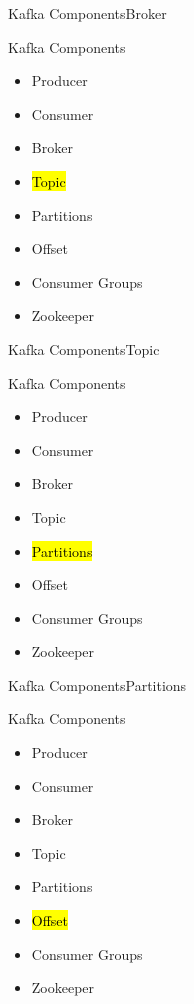 \documentclass{beamer}
\begin{document}
\begin{frame}{Kafka Components}{Broker}

\end{frame}

\begin{frame}{Kafka Components}
  \begin{itemize}
    \item Producer
    \item Consumer
    \item Broker
    \item \hl{Topic}
    \item Partitions
    \item Offset
    \item Consumer Groups
    \item Zookeeper
  \end{itemize}
\end{frame}

\begin{frame}{Kafka Components}{Topic}

\end{frame}

\begin{frame}{Kafka Components}
  \begin{itemize}
    \item Producer
    \item Consumer
    \item Broker
    \item Topic
    \item \hl{Partitions}
    \item Offset
    \item Consumer Groups
    \item Zookeeper
  \end{itemize}
\end{frame}

\begin{frame}{Kafka Components}{Partitions}

\end{frame}

\begin{frame}{Kafka Components}
  \begin{itemize}
    \item Producer
    \item Consumer
    \item Broker
    \item Topic
    \item Partitions
    \item \hl{Offset}
    \item Consumer Groups
    \item Zookeeper
  \end{itemize}
\end{frame}
\end{document}
